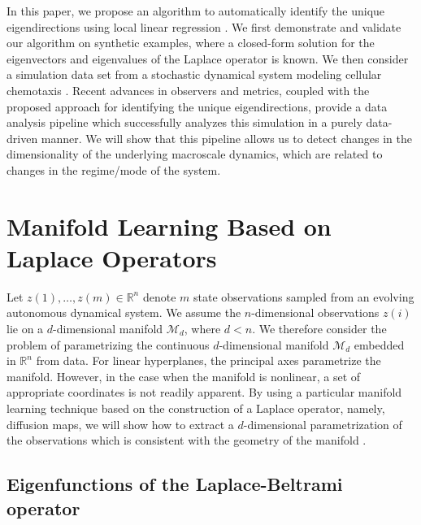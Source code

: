 \documentclass[3p]{elsarticle}
\begin{document}
In this paper, we propose an algorithm to automatically identify the unique eigendirections using local linear regression \cite{wasserman2006all}.
%
We first demonstrate and validate our algorithm on synthetic examples, where a closed-form solution for the
eigenvectors and eigenvalues of the Laplace operator is known.
%
We then consider a simulation data set from a stochastic dynamical system modeling
cellular chemotaxis \cite{othmer1988models}.
%
Recent advances in observers and metrics, coupled with the proposed approach for identifying the unique eigendirections,
provide a data analysis pipeline which successfully analyzes this simulation in a purely data-driven manner.
%
We will show that this pipeline allows us to detect changes in the dimensionality of the underlying macroscale dynamics, which are
related to changes in the regime/mode of the system.


\section{Manifold Learning Based on Laplace Operators}
%
%

Let $z(1), \dots, z(m) \in \mathbb{R}^n$ denote $m$ state observations sampled from an evolving autonomous dynamical system.
%
We assume the $n$-dimensional observations $z(i)$ lie on a $d$-dimensional manifold $\mathcal{M}_d$, where $d < n$.
%
We therefore consider the problem of parametrizing the continuous $d$-dimensional manifold $\mathcal{M}_d$ embedded in $\mathbb{R}^n$ from data.
%
For linear hyperplanes, the principal axes parametrize the manifold.
%
However, in the case when the manifold is nonlinear, a set of appropriate coordinates is not readily apparent.
%
By using a particular manifold learning technique based on the construction of a Laplace operator, namely, diffusion maps, we will show how to extract a $d$-dimensional parametrization of the observations which is consistent with the geometry of the manifold \cite{Belkin2003, coifman2005geometric, singer2008non}.

\subsection{Eigenfunctions of the Laplace-Beltrami operator}
\end{document}
